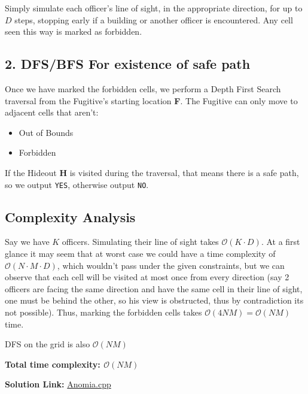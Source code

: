\documentclass{article}
\begin{document}
        \noindent Simply simulate each officer's line of sight, in the appropriate direction, for up to $ D $ steps,
        stopping early if a building or another officer is encountered. Any cell seen this way is marked as
        forbidden.
        

    \subsection*{2. DFS/BFS For existence of safe path}

        \noindent Once we have marked the forbidden cells, we perform a Depth First Search traversal from
        the Fugitive's starting location \textbf{F}. The Fugitive can only move to adjacent cells that aren't:
        \begin{itemize}
            \item{Out of Bounds}
            \item{Forbidden}
        \end{itemize}

        \noindent If the Hideout \textbf{H} is visited during the traversal, that means there is a safe path,
        so we output \texttt{YES}, otherwise output \texttt{NO}.


    \subsection*{Complexity Analysis}
        \noindent Say we have $ K $ officers. Simulating their line of sight takes $ \mathcal{O}(K \cdot D) $. At a first glance it may seem that at worst case we could have a time complexity of $ \mathcal{O}(N \cdot M \cdot
        D)$, which wouldn't pass under the given constraints, but we can observe that each cell will be visited
        at most once from every direction (say 2 officers are facing the same direction and have the same
        cell in their line of sight, one must be behind the other, so his view is obstructed, thus by contradiction its not possible).
        \noindent Thus, marking the forbidden cells takes $ \mathcal{O}(4NM) = \mathcal{O}(NM)$ time.

        
        \noindent
        DFS on the grid is also $ \mathcal{O}(NM)$
        \vspace{1em}

        
        \noindent
        \textbf{Total time complexity: $ \mathcal{O}(NM) $}
        
    \vspace{1em}
    \noindent \textbf{Solution Link:} 
    \href{https://github.com/StathisKons/GRCPC-2024-Editorial-Implementations/blob/main/F.%20Anomia.cpp}{Anomia.cpp}
    \vspace{1em}
    
\end{document}
